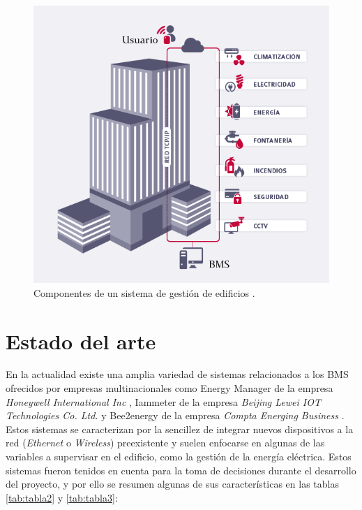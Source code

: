 \vspace{1cm}
\begin{figure}[htbp]
\centering
\includegraphics[width=.8\textwidth]{./Figures/bms3.png}
\caption{Componentes de un sistema de gestión de edificios \protect\footnotemark .}
\label{fig:bms}
\end{figure}


\section{Estado del arte}
En la actualidad existe una amplia variedad de sistemas relacionados a los BMS ofrecidos por empresas multinacionales como Energy Manager de la empresa \emph{Honeywell International Inc} \citep{WEBSITE:35}, Iammeter de la empresa \emph{Beijing Lewei IOT Technologies Co. Ltd.} \citep{WEBSITE:36} y Bee2energy de la empresa \emph{Compta Energing Business} \citep{WEBSITE:37}. Estos sistemas se caracterizan por la sencillez de integrar nuevos dispositivos a la red (\emph{Ethernet} o \emph{Wireless}) preexistente y suelen enfocarse en algunas de las variables a supervisar en el edificio, como la gestión de la energía eléctrica. Estos sistemas fueron tenidos en cuenta para la toma de decisiones durante el desarrollo del proyecto, y por ello se resumen algunas de sus características en las tablas \ref{tab:tabla2} y \ref{tab:tabla3}:



